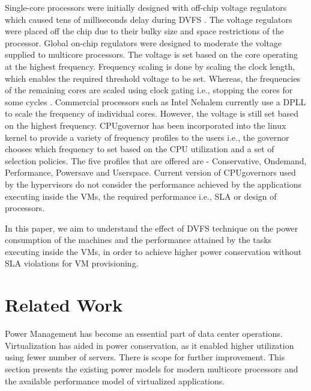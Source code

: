 \documentclass{sig-alternate}
\begin{document}
Single-core processors were initially designed with off-chip voltage regulators which caused tens of milliseconds delay during DVFS \cite{Zhao2011}. The voltage regulators were placed off the chip due to their bulky size and space restrictions of the processor. Global on-chip regulators were designed to moderate the voltage supplied to multicore processors. The voltage is set based on the core operating at the highest frequency. Frequency scaling is done by scaling the clock length, which enables the required threshold voltage to be set. Whereas, the frequencies of the remaining cores are scaled using clock gating i.e., stopping the cores for some cycles \cite{Yadav}. Commercial processors such as Intel Nehalem currently use a DPLL to scale the frequency of individual cores. However, the voltage is still set based on the highest frequency. 
CPUgovernor has been incorporated into the linux kernel to provide a variety of frequency profiles to the users i.e., the governor chooses which frequency to set based on the CPU utilization and a set of selection policies. The five profiles that are offered are - Conservative, Ondemand, Performance, Powersave and Userspace. Current version of CPUgovernors used by the hypervisors do not consider the performance achieved by the applications executing inside the VMs, the required performance i.e., SLA or design of processors. 

In this paper, we aim to understand the effect of DVFS technique on the power consumption of the machines and the performance attained by the tasks executing inside the VMs, in order to achieve higher power conservation without SLA violations for VM provisioning. 
\section{Related Work}
\label{sec:RWork}
Power Management has become an essential part of data center operations. Virtualization has aided in power conservation, as it enabled higher utilization using fewer number of servers. There is scope for further improvement. This section presents the existing power models for modern multicore processors and the available performance model of virtualized applications.
\end{document}
